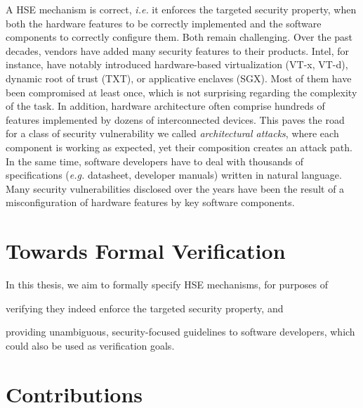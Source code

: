 A HSE mechanism is correct, \emph{i.e.} it enforces the targeted security
property, when both the hardware features to be correctly implemented and the
software components to correctly configure them.
%
Both remain challenging.
%
Over the past decades, vendors have added many security features to their
products.
%
Intel, for instance, have notably introduced hardware-based virtualization
(VT-x, VT-d), dynamic root of trust (TXT), or applicative enclaves (SGX).
%
Most of them have been compromised at least once, which is not surprising
regarding the complexity of the task.
%
In addition, hardware architecture often comprise hundreds of features
implemented by dozens of interconnected devices.
%
This paves the road for a class of security vulnerability we called
\emph{architectural attacks}, where each component is working as expected, yet
their composition creates an attack path.
%
In the same time, software developers have to deal with thousands of
specifications (\emph{e.g.} datasheet, developer manuals) written in natural
language.
%
Many security vulnerabilities disclosed over the years have been the result of a
misconfiguration of hardware features by key software components.

\section{Towards Formal Verification}

In this thesis, we aim to formally specify HSE mechanisms, for purposes of
%
\begin{inparaenum}[(1)]
\item verifying they indeed enforce the targeted security property, and
\item providing unambiguous, security-focused guidelines to software developers,
  which could also be used as verification goals.
\end{inparaenum}



\section{Contributions}
